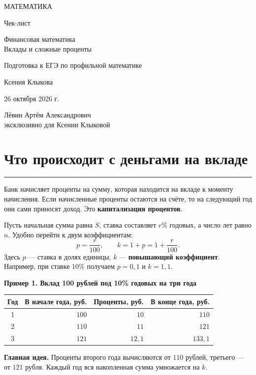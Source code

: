 \documentclass[a4paper,12pt]{article}
\newcommand{\lessonsection}[1]{\section{#1}\vspace{-0.2em}\noindent\textcolor{accent}{\rule{\linewidth}{0.55pt}}\vspace{0.2em}}
\newcommand{\keyidea}[1]{\par\noindent\textcolor{darkaccent}{\textbf{Главная идея.}} #1\par}
\newcommand{\exampletitle}[1]{\par\smallskip\noindent\textcolor{darkaccent}{\textbf{#1}}\par}
\begin{document}
\thispagestyle{empty}
\begin{titlepage}
\centering
\vspace*{25mm}
{\Large\color{darkaccent} МАТЕМАТИКА\par}
\vspace{14mm}
{\huge Чек-лист\par}
\vspace{10mm}
{\LARGE\color{accent} Финансовая математика\\[3mm] Вклады и сложные проценты\par}
\vspace{14mm}
{\large Подготовка к ЕГЭ по профильной математике\par}
\vfill
{\Large Ксения Клыкова\par}
\vspace{10mm}
{\large 26 октября 2026 г.\par}
\vspace{11mm}
{\normalsize Лёвин Артём Александрович\\ эксклюзивно для Ксении Клыковой\par}
\vspace{12mm}
\vspace{9mm}
\end{titlepage}
\setcounter{page}{1}
\lessonsection{Что происходит с деньгами на вкладе}
Банк начисляет проценты на сумму, которая находится на вкладе к моменту начисления. Если начисленные проценты остаются на счёте, то на следующий год они сами приносят доход. Это \textbf{капитализация процентов}.

Пусть начальная сумма равна $S$, ставка составляет $r\%$ годовых, а число лет равно $n$. Удобно перейти к двум коэффициентам:
\[
 p=\frac{r}{100},\qquad k=1+p=1+\frac{r}{100}.
\]
Здесь $p$ --- ставка в долях единицы, $k$ --- \textbf{повышающий коэффициент}. Например, при ставке $10\%$ получаем $p=0{,}1$ и $k=1{,}1$.

\exampletitle{Пример 1. Вклад 100 рублей под 10\% годовых на три года}
\begin{center}
\renewcommand{\arraystretch}{1.30}
\begin{tabular}{@{}c r r r@{}}
\toprule
Год & В начале года, руб. & Проценты, руб. & В конце года, руб.\\
\midrule
1 & $100$ & $10$ & $110$\\
2 & $110$ & $11$ & $121$\\
3 & $121$ & $12{,}1$ & $133{,}1$\\
\bottomrule
\end{tabular}
\end{center}
\keyidea{Проценты второго года вычисляются от $110$ рублей, третьего --- от $121$ рубля. Каждый год вся накопленная сумма умножается на $k$.}
\end{document}
